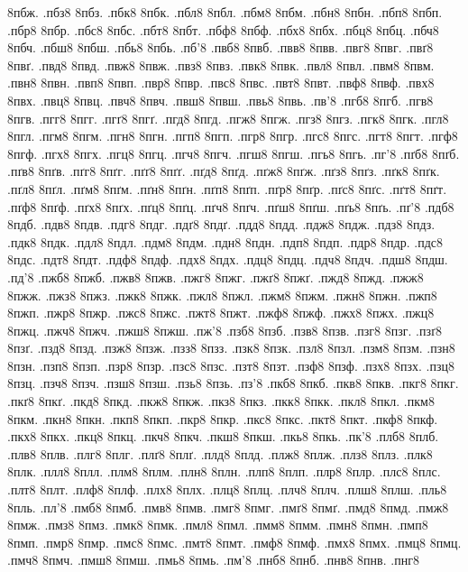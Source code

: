 {8пбж.
.пбз8
8пбз.
.пбк8
8пбк.
.пбл8
8пбл.
.пбм8
8пбм.
.пбн8
8пбн.
.пбп8
8пбп.
.пбр8
8пбр.
.пбс8
8пбс.
.пбт8
8пбт.
.пбф8
8пбф.
.пбх8
8пбх.
.пбц8
8пбц.
.пбч8
8пбч.
.пбш8
8пбш.
.пбь8
8пбь.
.пб'8
.пвб8
8пвб.
.пвв8
8пвв.
.пвг8
8пвг.
.пвґ8
8пвґ.
.пвд8
8пвд.
.пвж8
8пвж.
.пвз8
8пвз.
.пвк8
8пвк.
.пвл8
8пвл.
.пвм8
8пвм.
.пвн8
8пвн.
.пвп8
8пвп.
.пвр8
8пвр.
.пвс8
8пвс.
.пвт8
8пвт.
.пвф8
8пвф.
.пвх8
8пвх.
.пвц8
8пвц.
.пвч8
8пвч.
.пвш8
8пвш.
.пвь8
8пвь.
.пв'8
.пгб8
8пгб.
.пгв8
8пгв.
.пгг8
8пгг.
.пгґ8
8пгґ.
.пгд8
8пгд.
.пгж8
8пгж.
.пгз8
8пгз.
.пгк8
8пгк.
.пгл8
8пгл.
.пгм8
8пгм.
.пгн8
8пгн.
.пгп8
8пгп.
.пгр8
8пгр.
.пгс8
8пгс.
.пгт8
8пгт.
.пгф8
8пгф.
.пгх8
8пгх.
.пгц8
8пгц.
.пгч8
8пгч.
.пгш8
8пгш.
.пгь8
8пгь.
.пг'8
.пґб8
8пґб.
.пґв8
8пґв.
.пґг8
8пґг.
.пґґ8
8пґґ.
.пґд8
8пґд.
.пґж8
8пґж.
.пґз8
8пґз.
.пґк8
8пґк.
.пґл8
8пґл.
.пґм8
8пґм.
.пґн8
8пґн.
.пґп8
8пґп.
.пґр8
8пґр.
.пґс8
8пґс.
.пґт8
8пґт.
.пґф8
8пґф.
.пґх8
8пґх.
.пґц8
8пґц.
.пґч8
8пґч.
.пґш8
8пґш.
.пґь8
8пґь.
.пґ'8
.пдб8
8пдб.
.пдв8
8пдв.
.пдг8
8пдг.
.пдґ8
8пдґ.
.пдд8
8пдд.
.пдж8
8пдж.
.пдз8
8пдз.
.пдк8
8пдк.
.пдл8
8пдл.
.пдм8
8пдм.
.пдн8
8пдн.
.пдп8
8пдп.
.пдр8
8пдр.
.пдс8
8пдс.
.пдт8
8пдт.
.пдф8
8пдф.
.пдх8
8пдх.
.пдц8
8пдц.
.пдч8
8пдч.
.пдш8
8пдш.
.пд'8
.пжб8
8пжб.
.пжв8
8пжв.
.пжг8
8пжг.
.пжґ8
8пжґ.
.пжд8
8пжд.
.пжж8
8пжж.
.пжз8
8пжз.
.пжк8
8пжк.
.пжл8
8пжл.
.пжм8
8пжм.
.пжн8
8пжн.
.пжп8
8пжп.
.пжр8
8пжр.
.пжс8
8пжс.
.пжт8
8пжт.
.пжф8
8пжф.
.пжх8
8пжх.
.пжц8
8пжц.
.пжч8
8пжч.
.пжш8
8пжш.
.пж'8
.пзб8
8пзб.
.пзв8
8пзв.
.пзг8
8пзг.
.пзґ8
8пзґ.
.пзд8
8пзд.
.пзж8
8пзж.
.пзз8
8пзз.
.пзк8
8пзк.
.пзл8
8пзл.
.пзм8
8пзм.
.пзн8
8пзн.
.пзп8
8пзп.
.пзр8
8пзр.
.пзс8
8пзс.
.пзт8
8пзт.
.пзф8
8пзф.
.пзх8
8пзх.
.пзц8
8пзц.
.пзч8
8пзч.
.пзш8
8пзш.
.пзь8
8пзь.
.пз'8
.пкб8
8пкб.
.пкв8
8пкв.
.пкг8
8пкг.
.пкґ8
8пкґ.
.пкд8
8пкд.
.пкж8
8пкж.
.пкз8
8пкз.
.пкк8
8пкк.
.пкл8
8пкл.
.пкм8
8пкм.
.пкн8
8пкн.
.пкп8
8пкп.
.пкр8
8пкр.
.пкс8
8пкс.
.пкт8
8пкт.
.пкф8
8пкф.
.пкх8
8пкх.
.пкц8
8пкц.
.пкч8
8пкч.
.пкш8
8пкш.
.пкь8
8пкь.
.пк'8
.плб8
8плб.
.плв8
8плв.
.плг8
8плг.
.плґ8
8плґ.
.плд8
8плд.
.плж8
8плж.
.плз8
8плз.
.плк8
8плк.
.плл8
8плл.
.плм8
8плм.
.плн8
8плн.
.плп8
8плп.
.плр8
8плр.
.плс8
8плс.
.плт8
8плт.
.плф8
8плф.
.плх8
8плх.
.плц8
8плц.
.плч8
8плч.
.плш8
8плш.
.пль8
8пль.
.пл'8
.пмб8
8пмб.
.пмв8
8пмв.
.пмг8
8пмг.
.пмґ8
8пмґ.
.пмд8
8пмд.
.пмж8
8пмж.
.пмз8
8пмз.
.пмк8
8пмк.
.пмл8
8пмл.
.пмм8
8пмм.
.пмн8
8пмн.
.пмп8
8пмп.
.пмр8
8пмр.
.пмс8
8пмс.
.пмт8
8пмт.
.пмф8
8пмф.
.пмх8
8пмх.
.пмц8
8пмц.
.пмч8
8пмч.
.пмш8
8пмш.
.пмь8
8пмь.
.пм'8
.пнб8
8пнб.
.пнв8
8пнв.
.пнг8
}
